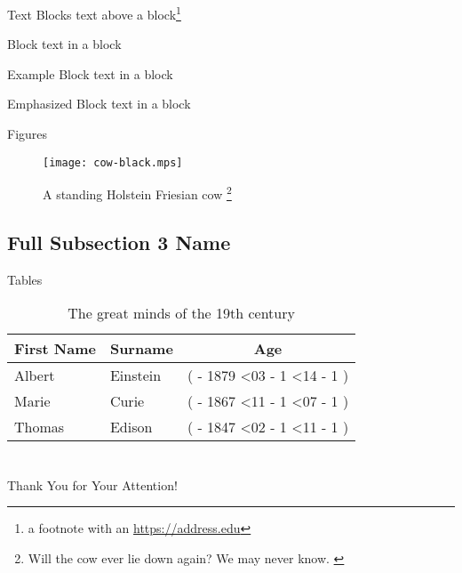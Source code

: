 \documentclass[
  aspectratio=169,
]{beamer}
\begin{document}
\begin{frame}{Text Blocks}
text above a block\footnote{a footnote with an \url{https://address.edu}}
\begin{block}{Block}
  text in a block
\end{block}
\begin{exampleblock}{Example Block}
  text in a block
\end{exampleblock}
\begin{alertblock}{Emphasized Block}
  text in a block
\end{alertblock}
\end{frame}

\begin{frame}{Figures}
\begin{figure}
  \texttt{[image: cow-black.mps]}
  \caption{A standing Holstein Friesian cow%
    \footnote{%
      Will the cow ever lie down again?
      We may never know.
      \cite{tolkamp10cows}
    }%
  }
\end{figure}
\end{frame}

\subsection[Short Subsection 3 Name]{Full Subsection 3 Name}

\def\age(#1-#2-#3){%
  \the\numexpr(
    \year - #1
    \ifnum\month<#2
      - 1
    \else
      \ifnum\month=#2
        \ifnum\day<#3
          - 1
        \fi
      \fi
    \fi
  )%
}

\begin{frame}{Tables}
\begin{table}
  \begin{tabular}{llc}
    First Name & Surname & Age \\ \midrule
    Albert & Einstein & \age(1879-03-14) \\
    Marie & Curie & \age(1867-11-07) \\
    Thomas & Edison & \age(1847-02-11) \\
  \end{tabular}
  \caption{The great minds of the 19th century}
\end{table}
\end{frame}

\section{\bibname}
\begin{frame}[t, allowframebreaks]{\bibname}
\printbibliography[heading=none]
\end{frame}

\begin{frame}[plain]
\vfill
\centerline{Thank You for Your Attention!}
\vfill\vfill
\end{frame}
\end{document}
